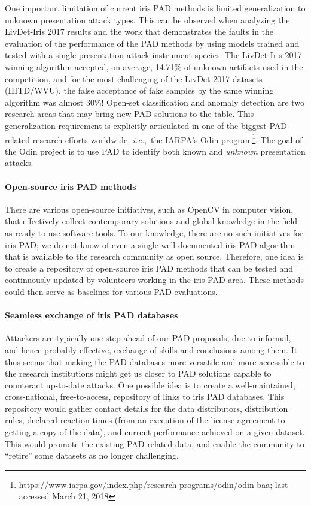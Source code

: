 \documentclass[format=acmsmall, review=false, timestamp=false]{acmart}
\newcommand{\ie}{{\it i.e.},~}
\begin{document}
One important limitation of current iris PAD methods is limited generalization to unknown presentation attack types. This can be observed when analyzing the LivDet-Iris 2017 results \cite{Yambay_IJCB_2017} {and the work \cite{Sequeira_TSP_2016} that demonstrates the faults in the evaluation of the performance of the PAD methods by using models trained and tested with a single presentation attack instrument species.} The {LivDet-Iris 2017} winning algorithm accepted, on average, 14.71\% of unknown artifacts used in the competition, and for the most challenging of the LivDet 2017 datasets (IIITD/WVU), the false acceptance of {fake samples} by the same winning algorithm was almost 30\%! Open-set classification and anomaly detection are two research areas that may bring new PAD solutions to the table. This generalization requirement is explicitly articulated in one of the biggest PAD-related research efforts worldwide, \ie the IARPA's Odin program\footnote{https://www.iarpa.gov/index.php/research-programs/odin/odin-baa; last accessed March 21, 2018}. The goal of the Odin project is to use PAD to identify both known and {\it unknown} presentation attacks.

\paragraph{Open-source iris PAD methods}

There are various open-source initiatives, such as OpenCV in computer vision, that effectively collect contemporary solutions and global knowledge in the field as ready-to-use software tools. To our knowledge, there are no such initiatives for iris PAD; we do not know of even a single well-documented iris PAD algorithm that is available to the research community as open source. Therefore, one idea is to create a repository of open-source iris PAD methods that can be tested and continuously updated by volunteers working in the iris PAD area. These methods could then serve as baselines for various PAD evaluations.

\paragraph{Seamless exchange of iris PAD databases}

Attackers are typically one step ahead of our PAD proposals, due to informal, and hence probably effective, exchange of skills and conclusions among them. It thus seems that making the PAD databases more versatile and more accessible to the research institutions might get us closer to PAD solutions capable to counteract up-to-date attacks. One possible idea is to create a well-maintained, cross-national, free-to-access, repository of links to iris PAD databases. This repository would gather contact details for the data distributors, distribution rules, declared reaction times (from an execution of the license agreement to getting a copy of the data), and current performance achieved on a given dataset. This would promote the existing PAD-related data, and enable the community to ``retire'' some datasets as no longer challenging.
\end{document}
